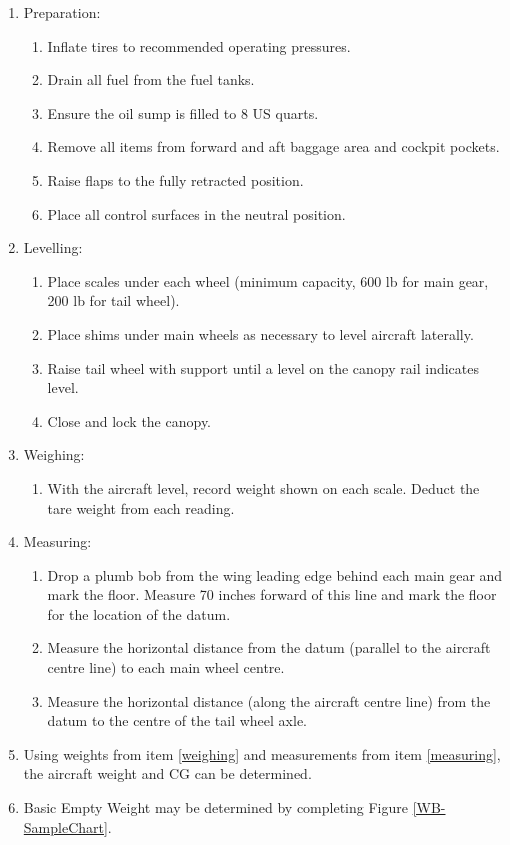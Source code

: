\begin{enumerate}
  \item Preparation:
    \begin{enumerate}
      \item Inflate tires to recommended operating pressures.
      \item Drain all fuel from the fuel tanks.
      \item Ensure the oil sump is filled to 8 US quarts.
      \item Remove all items from forward and aft baggage area and cockpit pockets.
      \item Raise flaps to the fully retracted position.
      \item Place all control surfaces in the neutral position.
    \end{enumerate}
  \item Levelling:
    \begin{enumerate}
      \item Place scales under each wheel (minimum capacity, 600 lb for main gear, 200 lb for tail wheel).
      \item Place shims under main wheels as necessary to level aircraft laterally.
      \item Raise tail wheel with support until a level on the canopy rail indicates level.
  
   \item Close and lock the canopy.
    \end{enumerate}
  \item Weighing:
  \label{weighing}
    \begin{enumerate}
      \item With the aircraft level, record weight shown on each scale. Deduct the tare weight from each reading.
    \end{enumerate}
  \item Measuring:
  \label{measuring}
    \begin{enumerate}
      \item Drop a plumb bob from the wing leading edge behind each main gear and mark the floor. Measure 70 inches
forward of this line and mark the floor for the location of the datum.
      \item Measure the horizontal distance from the datum (parallel to the aircraft centre line) to each main wheel
centre.
      \item Measure the horizontal distance (along the aircraft centre line) from the datum to the centre
of the tail wheel axle.
    \end{enumerate}
  \item Using weights from item \ref{weighing} and measurements from item \ref{measuring}, the aircraft weight and CG
can be determined.\label{calc-wb}
  \item Basic Empty Weight may be determined by completing Figure \ref{WB-SampleChart}.
  \end{enumerate}

